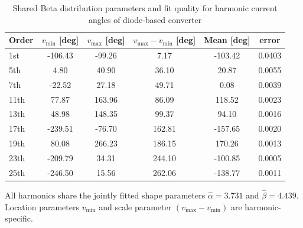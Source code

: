     

\begin{table}[!b]
    \centering
    \caption{Shared Beta distribution parameters and fit quality for harmonic current angles of diode-based converter}
    \label{tab:beta_phase_params}
    \scriptsize
    \setlength{\tabcolsep}{3pt}
    \begin{tabular}{l c c c c c}
    Order & $v_{\min}$ [deg] & $v_{\max}$ [deg] & $v_{\max}-v_{\min}$ [deg] & Mean [deg] & error \\
    \hline
    1st & -106.43 & -99.26 & 7.17 & -103.42 & 0.0403 \\
    5th & 4.80 & 40.90 & 36.10 & 20.87 & 0.0055 \\
    7th & -22.52 & 27.18 & 49.71 & 0.08 & 0.0039 \\
    11th & 77.87 & 163.96 & 86.09 & 118.52 & 0.0023 \\
    13th & 48.98 & 148.35 & 99.37 & 94.10 & 0.0016 \\
    17th & -239.51 & -76.70 & 162.81 & -157.65 & 0.0020 \\
    19th & 80.08 & 266.23 & 186.15 & 170.26 & 0.0013 \\
    23th & -209.79 & 34.31 & 244.10 & -100.85 & 0.0005 \\
    25th & -246.50 & 15.56 & 262.06 & -138.77 & 0.0011 \\
    \end{tabular}
    \vspace{2pt}
    \parbox{\columnwidth}{\scriptsize All harmonics share the jointly fitted shape parameters $\hat{\alpha}=3.731$ and $\hat{\beta}=4.439$. \\
    Location parameters $v_{\min}$ and scale parameter $(v_{\max} - v_{\min})$ are harmonic-specific.}
\end{table}

